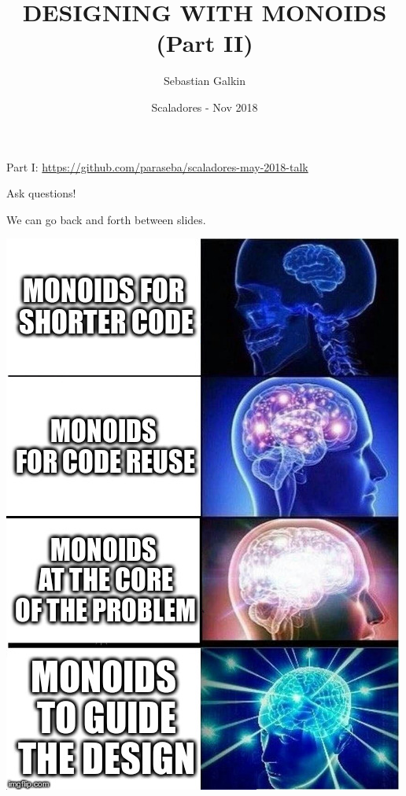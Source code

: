 \documentclass{beamer}
\title[Monoids]{DESIGNING WITH MONOIDS \hspace{0.6cm} (Part II)}
\author{Sebastian Galkin}
\institute[@paraseba]{\texttt{@paraseba} \\ \texttt{paraseba@gmail.com}}
\date[Scaladores]{Scaladores - Nov 2018}
\begin{document}


\begin{frame}
  \titlepage
  \vspace{0.3cm}
  Part I: \href{https://github.com/paraseba/scaladores-may-2018-talk}{https://github.com/paraseba/scaladores-may-2018-talk}
  \vspace{0.2cm}
  \begin{block}{}
    \centering
    \large{Ask questions!}
  \end{block}

  \begin{block}{}
    \centering
    \large{We can go back and forth between slides.}
  \end{block}
\end{frame}

\begin{frame}[plain]
  \center
\includegraphics[keepaspectratio=true,width=0.45\paperwidth]{brain.jpg}
\end{frame}
\end{document}
